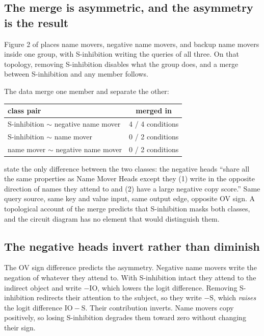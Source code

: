 \subsection{The merge is asymmetric, and the asymmetry is the result}

Figure 2 of \citet{wang2022ioi} places name movers, negative name movers, and backup name
movers inside one group, with S-inhibition writing the queries of all three. On that
topology, removing S-inhibition disables what the group does, and a merge between
S-inhibition and any member follows.

The data merge one member and separate the other:

\begin{center}
\begin{tabular}{lc}
\toprule
class pair & merged in \\
\midrule
S-inhibition $\sim$ negative name mover & 4 / 4 conditions \\
S-inhibition $\sim$ name mover & 0 / 2 conditions \\
name mover $\sim$ negative name mover & 0 / 2 conditions \\
\bottomrule
\end{tabular}
\end{center}

\citet{wang2022ioi} state the only difference between the two classes: the negative heads
``share all the same properties as Name Mover Heads except they (1) write in the opposite
direction of names they attend to and (2) have a large negative copy score.'' Same query
source, same key and value input, same output edge, opposite OV sign. A topological account
of the merge predicts that S-inhibition masks both classes, and the circuit diagram has no
element that would distinguish them.

\subsection{The negative heads invert rather than diminish}

The OV sign difference predicts the asymmetry. Negative name movers write the negation of
whatever they attend to. With S-inhibition intact they attend to the indirect object and
write $-\mathrm{IO}$, which lowers the logit difference. Removing S-inhibition redirects
their attention to the subject, so they write $-\mathrm{S}$, which \emph{raises} the logit
difference $\mathrm{IO} - \mathrm{S}$. Their contribution inverts. Name movers copy
positively, so losing S-inhibition degrades them toward zero without changing their sign.

